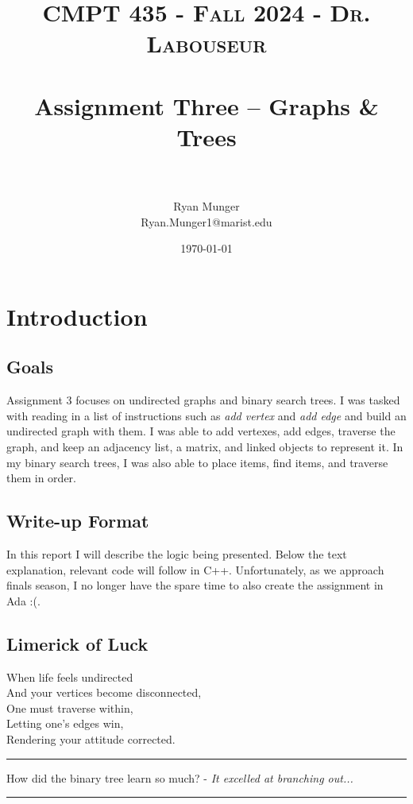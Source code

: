 \documentclass[letterpaper, 10pt]{article}
\title{	
   \normalfont \normalsize 
   \textsc{CMPT 435 - Fall 2024 - Dr. Labouseur} \\[10pt] %
   \horrule{0.5pt} \\[0.25cm] 	%
   \huge Assignment Three -- Graphs \& Trees\\     	    %
   \horrule{0.5pt} \\[0.25cm] 	%
}
\author{Ryan Munger \\ \normalsize Ryan.Munger1@marist.edu}
\date{\normalsize\today} 	%
\begin{document}
\maketitle %


\section{Introduction}
\subsection{Goals}
Assignment 3 focuses on undirected graphs and binary search trees. I was tasked with reading in a list of instructions such as \textit{add vertex} and \textit{add edge} and build an undirected graph with them. I was able to add vertexes, add edges, traverse the graph, and keep an adjacency list, a matrix, and linked objects to represent it. In my binary search trees, I was also able to place items, find items, and traverse them in order. 
\subsection{Write-up Format}
    In this report I will describe the logic being presented. Below the text explanation, relevant code will follow in C++. Unfortunately, as we approach finals season, I no longer have the spare time to also create the assignment in Ada :(. 
\subsection{Limerick of Luck}
\noindent
When life feels undirected \\
And your vertices become disconnected, \\
    \hspace*{1.5em}One must traverse within, \\
    \hspace*{1.5em}Letting one's edges win, \\
Rendering your attitude corrected. \\

\hrule
\vspace{.25cm}
How did the binary tree learn so much? - \textit{It excelled at branching out...}\\
\hrule
\vspace{.25cm}
\end{document}
